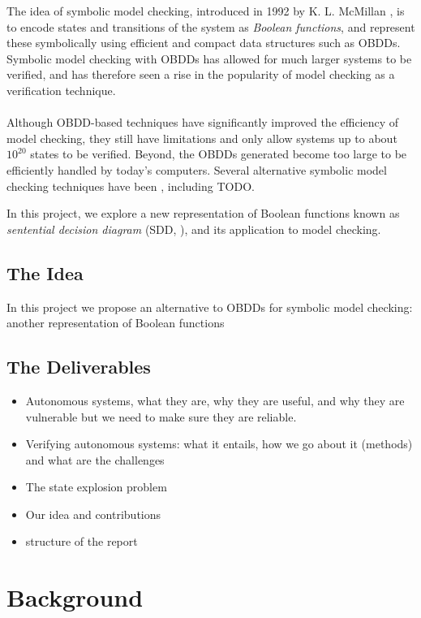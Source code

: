 \documentclass[11pt]{article}
\begin{document}
The idea of symbolic model checking, introduced in 1992 by K. L. McMillan \cite{symbolic}, is to encode states and transitions of the system as \textit{Boolean functions}, and represent these symbolically using efficient and compact data structures such as OBDDs. Symbolic model checking with OBDDs has allowed for much larger systems to be verified, and has therefore seen a rise in the popularity of model checking as a verification technique.
\\\\

Although OBDD-based techniques have significantly improved the efficiency of model checking, they still have limitations and only allow systems up to about $10^{20}$ states to be verified. Beyond, the OBDDs generated become too large to be efficiently handled by today's computers. Several alternative symbolic model checking techniques have been , including TODO.

In this project, we explore a new representation of Boolean functions known as \textit{sentential decision diagram} (SDD, \cite{sdd_1}), and its application to model checking. 

\subsection{The Idea}

In this project we propose an alternative to OBDDs for symbolic model checking: another representation of Boolean functions

\subsection{The Deliverables}


\begin{itemize}
\item Autonomous systems, what they are, why they are useful, and why they are vulnerable but we need to make sure they are reliable.
\item Verifying autonomous systems: what it entails, how we go about it (methods) and what are the challenges
\item The state explosion problem
\item Our idea and contributions
\item structure of the report
\end{itemize}

\section{Background}
\end{document}
